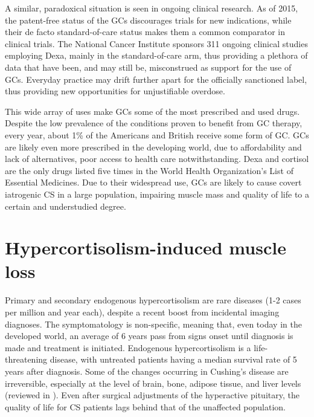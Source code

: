 \documentclass[12pt,english]{report}\usepackage[]{graphicx}\usepackage[]{color}
\begin{document}
A similar, paradoxical situation is seen in ongoing clinical research.
As of 2015, the patent-free status of the GCs discourages trials for
new indications, while their de facto standard-of-care status makes
them a common comparator in clinical trials. The National Cancer Institute
sponsors 311 ongoing clinical studies employing Dexa, mainly in the
standard-of-care arm, thus providing a plethora of data that have
been, and may still be, misconstrued as support for the use of GCs.
Everyday practice may drift further apart for the officially sanctioned
label, thus providing new opportunities for unjustifiable overdose.

This wide array of uses make GCs some of the most prescribed and used
drugs. Despite the low prevalence of the conditions proven to benefit
from GC therapy, every year, about 1\% of the Americans and British
receive some form of GC\citep{skversky2011association,vanstaa2000use}.
GCs are likely even more prescribed in the developing world, due to
affordability and lack of alternatives, poor access to health care
notwithstanding. Dexa and cortisol are the only drugs listed five
times in the World Health Organization's List of Essential Medicines\citep{worldhealthorganization2013who}.
Due to their widespread use, GCs are likely to cause covert iatrogenic
CS in a large population, impairing muscle mass and quality of life
to a certain and understudied degree.


\section{Hypercortisolism-induced muscle loss}

Primary and secondary endogenous hypercortisolism are rare diseases
(1-2 cases per million and year each\citep{lindholm2001incidence}),
despite a recent boost from incidental imaging diagnoses. The symptomatology
is non-specific, meaning that, even today in the developed world,
an average of 6 years pass from signs onset until diagnosis is made
and treatment is initiated\citep{psaras2011demographic}. Endogenous
hypercortisolism is a life-threatening disease, with untreated patients
having a median survival rate of 5 years after diagnosis\citep{plotz1952natural}.
Some of the changes occurring in Cushing's disease are irreversible,
especially at the level of brain, bone, adipose tissue, and liver
levels (reviewed in \citep{valassi2012clinical}). Even after surgical
adjustments of the hyperactive pituitary, the quality of life for
CS patients lags behind that of the unaffected population. 
\end{document}
